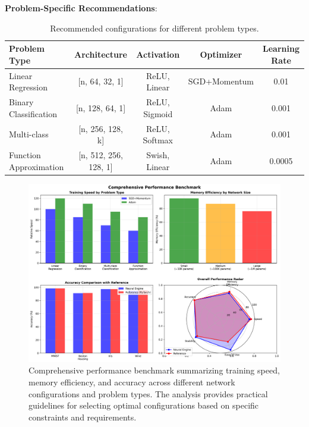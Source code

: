 \documentclass[11pt,a4paper]{report}
\begin{document}
\textbf{Problem-Specific Recommendations}:

\begin{table}[H]
\centering
\caption{Recommended configurations for different problem types.}
\label{tab:configuration_recommendations}
\begin{autotable}[0.95]
\begin{tabular}{lcccc}
\toprule
Problem Type & Architecture & Activation & Optimizer & Learning Rate \\
\midrule
Linear Regression & [n, 64, 32, 1] & ReLU, Linear & SGD+Momentum & 0.01 \\
Binary Classification & [n, 128, 64, 1] & ReLU, Sigmoid & Adam & 0.001 \\
Multi-class & [n, 256, 128, k] & ReLU, Softmax & Adam & 0.001 \\
Function Approximation & [n, 512, 256, 128, 1] & Swish, Linear & Adam & 0.0005 \\
\bottomrule
\end{tabular}
\end{autotable}
\end{table}

\begin{figure}[H]
\centering
\includegraphics[width=\textwidth]{performance_comprehensive_benchmark.png}
\caption{Comprehensive performance benchmark summarizing training speed, memory efficiency, and accuracy across different network configurations and problem types. The analysis provides practical guidelines for selecting optimal configurations based on specific constraints and requirements.}
\label{fig:comprehensive_benchmark}
\end{figure}
\end{document}
